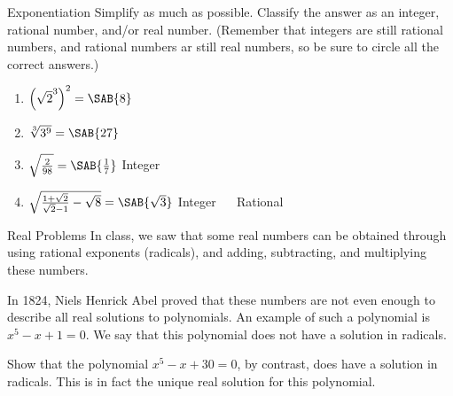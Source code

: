 \documentclass[12pt,letterpaper]{article}
\begin{document}
\begin{problem}{Exponentiation}
  Simplify as much as possible. Classify the answer as an integer, rational number, and/or
  real number. (Remember that integers are still rational numbers, and rational numbers ar
  still real numbers, so be sure to circle all the correct answers.)

  \begin{enumerate}
    \item \({\left(\sqrt{2}^3\right)}^2 = \SAB{8}\)
    \hfill {} ~~  ~~ 
    \item \(\sqrt[3]{3^9} = \SAB{27}\)
    \hfill {} ~~  ~~ 
    \item \(\sqrt{\frac{2}{98}} = \SAB{\frac{1}{7}}\)
    \hfill Integer ~~  ~~ 
    \item \(\sqrt{\frac{1 + \sqrt{2}}{\sqrt{2} - 1} - \sqrt{8}} = \SAB{\sqrt{3}}\)
    \hfill Integer ~~ Rational ~~ 
  \end{enumerate}
\end{problem}

\begin{problem}{Real Problems}
  In class, we saw that some real numbers can be obtained through using rational exponents
  (radicals), and adding, subtracting, and multiplying these numbers.

  In 1824, Niels Henrick Abel proved that these numbers are not even enough to describe all
  real solutions to polynomials. An example of such a polynomial is $x^5 - x + 1 = 0$. We
  say that this polynomial does not have a solution in radicals.

  Show that the polynomial $x^5 - x + 30 = 0$, by contrast, does have a solution in
  radicals. This is in fact the unique real solution for this polynomial. 
\end{problem}
\end{document}
